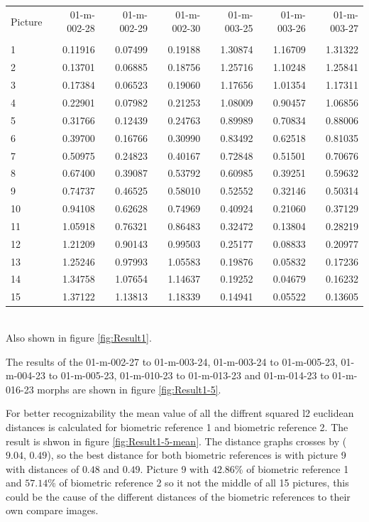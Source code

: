 \begin{tabular}{lrrrrrr}
	Picture & 01-m-002-28 & 01-m-002-29 & 01-m-002-30 & 01-m-003-25 & 01-m-003-26 & 01-m-003-27 \\
	 & & & & & & \\
	1 & 0.11916 & 0.07499 & 0.19188 & 1.30874 & 1.16709 & 1.31322\\
	2 & 0.13701 & 0.06885 & 0.18756 & 1.25716 & 1.10248 & 1.25841\\ 
	3 & 0.17384 & 0.06523 & 0.19060 & 1.17656 & 1.01354 & 1.17311\\ 
	4 & 0.22901 & 0.07982 & 0.21253 & 1.08009 & 0.90457 & 1.06856\\ 
	5 & 0.31766 & 0.12439 & 0.24763 & 0.89989 & 0.70834 & 0.88006\\ 
	6 & 0.39700 & 0.16766 & 0.30990 & 0.83492 & 0.62518 & 0.81035\\ 
	7 & 0.50975 & 0.24823 & 0.40167 & 0.72848 & 0.51501 & 0.70676\\ 
	8 & 0.67400 & 0.39087 & 0.53792 & 0.60985 & 0.39251 & 0.59632\\ 
	9 & 0.74737 & 0.46525 & 0.58010 & 0.52552 & 0.32146 & 0.50314\\ 
	10 & 0.94108 & 0.62628 & 0.74969 & 0.40924 & 0.21060 & 0.37129\\ 
	11 & 1.05918 & 0.76321 & 0.86483 & 0.32472 & 0.13804 & 0.28219\\ 
	12 & 1.21209 & 0.90143 & 0.99503 & 0.25177 & 0.08833 & 0.20977\\ 
	13 & 1.25246 & 0.97993 & 1.05583 & 0.19876 & 0.05832 & 0.17236\\ 
	14 & 1.34758 & 1.07654 & 1.14637 & 0.19252 & 0.04679 & 0.16232\\ 
	15 & 1.37122 & 1.13813 & 1.18339 & 0.14941 & 0.05522 & 0.13605\\ 
\end{tabular}\\

Also shown in figure \ref{fig:Result1}.

The results of the 01-m-002-27 to 01-m-003-24, 01-m-003-24 to 01-m-005-23, 01-m-004-23 to 01-m-005-23, 01-m-010-23 to 01-m-013-23 and 01-m-014-23 to 01-m-016-23 morphs are shown in figure \ref{fig:Result1-5}.

For better recognizability the mean value of all the diffrent squared l2 euclidean distances is calculated for biometric reference 1 and biometric reference 2. The result is shwon in figure \ref{fig:Result1-5-mean}. The distance graphs crosses by ($9.04$, $0.49$), so the best distance for both biometric references is with picture 9 with distances of $0.48$ and $0.49$. Picture 9 with $42.86$\% of biometric reference 1 and $57.14$\% of biometric reference 2 so it  not the middle of all 15 pictures, this could be the cause of the different distances of the biometric references to their own compare images.

